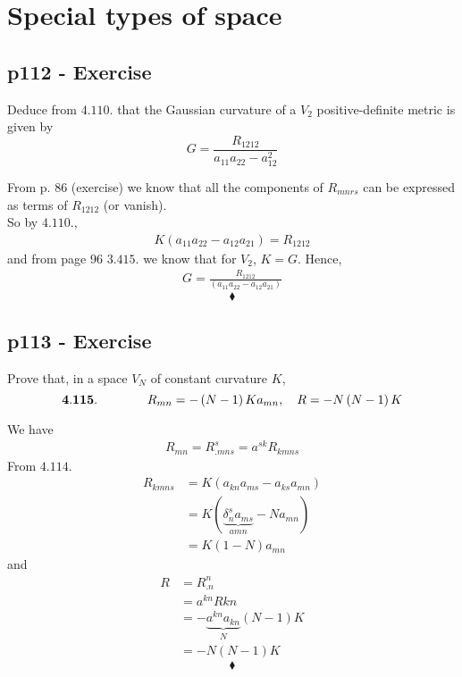 \chapter{Special types of space}
\pagebreak[4]
\section{p112 - Exercise}
\begin{tcolorbox}
Deduce from $4.110.$ that the Gaussian curvature of a $V_2$ positive-definite metric is given by $$ G = \frac{R_{1212}}{a_{11}a_{22}-a_{12}^2}$$
\end{tcolorbox}
From p. 86 (exercise) we know that all the components of $R_{mnrs}$ can be expressed as terms of $R_{1212}$ (or vanish). \\
So by $4.110.$, 
\begin{align}
K\left({a_{11}a_{22}-a_{12}a_{21}}\right) = R_{1212}
\end{align}
and from page 96 $3.415.$ we know that for $V_2$, $K=G$. Hence,
\begin{align}
G = \frac{R_{1212}}{\left(a_{11}a_{22}-a_{12}a_{21}\right)}
\end{align}
$$\blacklozenge$$
\newpage

\section{p113 - Exercise}
\begin{tcolorbox}
Prove that, in a space $V_N$ of constant curvature $K$,$$\mathbf{4.115.}\quad\quad\quad\quad R_{mn} = -\left(N-1\right)Ka_{mn}, \quad R = -N\left(N-1\right)K$$
\end{tcolorbox}
We have
\begin{align}
R_{mn} = R^s_{.mns} = a^{sk}R_{kmns}
\end{align}
From $4.114.$
\begin{align}
R_{kmns} &= K\left(a_{kn}a_{ms}-a_{ks}a_{mn}\right)\\
&= K \left(\underbrace{\delta^s_n a_{ms}}_{a{mn}}-Na_{mn}\right)\\
&= K\left(1-N\right)a_{mn}
\end{align}
and 
\begin{align}
R &= R^n_{.n}\\
&= a^{kn}R{kn}\\
&= -\underbrace{a^{kn}a_{kn}}_{N}\left( N-1 \right)K\\
&= -N\left( N-1 \right)K
\end{align}
$$\blacklozenge$$
\newpage

